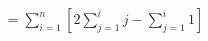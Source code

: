 \documentclass[preview]{standalone}
\begin{document}
\begin{align*}
= \sum_{i=1}^{n} \left[2 \sum_{j=1}^{i} j - \sum_{j=1}^{i} 1\right]
\end{align*}
\end{document}
